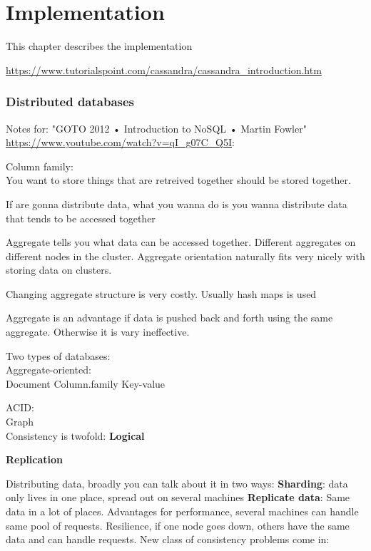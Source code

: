 \chapter{Implementation}

This chapter describes the implementation


\url{https://www.tutorialspoint.com/cassandra/cassandra_introduction.htm}



\subsection{Distributed databases}


Notes for:
"GOTO 2012 • Introduction to NoSQL • Martin Fowler" \url{https://www.youtube.com/watch?v=qI_g07C_Q5I}:

Column family:\\
You want to store things that are retreived together should be stored together. 

If are gonna distribute data, what you wanna do is you wanna distribute data that tends to be accessed together

Aggregate tells you what data can be accessed together. Different aggregates on different nodes in the cluster. Aggregate orientation naturally fits very nicely with storing data on clusters.


Changing aggregate structure is very costly. Usually hash maps is used

Aggregate is an advantage if data is pushed back and forth using the same aggregate. Otherwise it is vary ineffective.

Two types of databases:\\
Aggregate-oriented:\\
Document
Column.family
Key-value

ACID:\\
Graph
\\

Consistency is twofold:
\textbf{Logical}


\textbf{Replication}



Distributing data, broadly you can talk about it in two ways:
\textbf{Sharding}: data only lives in one place, spread out on several machines
\textbf{Replicate data}: Same data in a lot of places. 
Advantages for performance, several machines can handle same pool of requests.
Resilience, if one node goes down, others have the same data and can handle requests.
New class of consistency problems come in:

